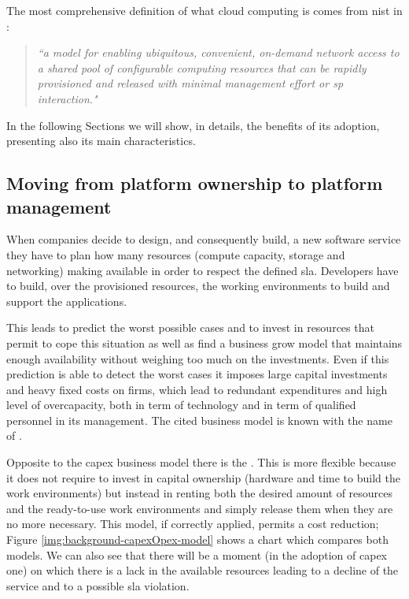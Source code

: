 The most comprehensive definition of what cloud computing is comes from \ac{nist} in \cite{nistCloudComputing}:

\begin{center}
	\begin{quote}
		\textit{``a model for enabling ubiquitous, convenient, on-demand network access
			to a shared pool of configurable computing resources that can be rapidly provisioned and released
			with minimal management effort or \acf{sp} interaction."}
	\end{quote}
\end{center}

In the following Sections we will show, in details, the benefits of its adoption, presenting also its
main characteristics.

\subsection{Moving from platform ownership to platform management}
\label{sec:background-cloudComputing-capexOpex}
When companies decide to design, and consequently build, a new software service they have to plan how
many resources (compute capacity, storage and networking) making available in order to respect the defined
\ac{sla}. Developers have to build, over the provisioned resources, the working environments to build
and support the applications.

This leads to predict the worst possible cases and to invest in resources that permit to cope this
situation as well as find a business grow model that maintains enough availability without weighing
too much on the investments. Even if this prediction is able to detect the worst cases it imposes
large capital investments and heavy fixed costs on firms, which lead to redundant expenditures and
high level of overcapacity, both in term of technology and in term of qualified personnel in its
management. The cited business model is known with the name of .

Opposite to the \ac{capex} business model there is the . This is more flexible
because it does not require to invest in capital ownership (hardware and time to build the work
environments) but instead in renting both the desired amount of resources and the ready-to-use work
environments and simply release them when they are no more necessary. This model, if correctly applied,
permits a cost reduction; Figure \ref{img:background-capexOpex-model} shows a chart which compares
both models. We can also see that there will be a moment (in the adoption of \ac{capex} one) on which
there is a lack in the available resources leading to a decline of the service and to a possible \ac{sla}
violation.

